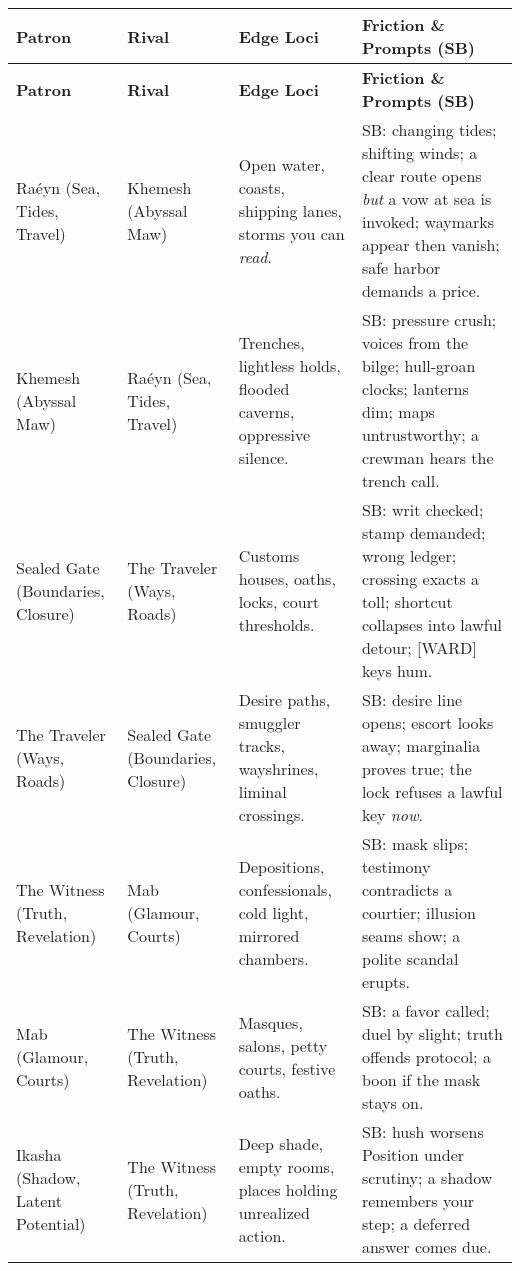 \begin{longtable}{@{}p{3.3cm}p{3.3cm}p{4.6cm}p{7.2cm}@{}}
\toprule
\textbf{Patron} & \textbf{Rival} & \textbf{Edge Loci} & \textbf{Friction \& Prompts (SB)} \\
\midrule
\endfirsthead

\toprule
\textbf{Patron} & \textbf{Rival} & \textbf{Edge Loci} & \textbf{Friction \& Prompts (SB)} \\
\midrule
\endhead

\bottomrule
\endfoot
Raéyn (Sea, Tides, Travel) & Khemesh (Abyssal Maw) &
Open water, coasts, shipping lanes, storms you can \emph{read}. &
SB: changing tides; shifting winds; a clear route opens \emph{but} a vow at sea is invoked; waymarks appear then vanish; safe harbor demands a price. \\

Khemesh (Abyssal Maw) & Raéyn (Sea, Tides, Travel) &
Trenches, lightless holds, flooded caverns, oppressive silence. &
SB: pressure crush; voices from the bilge; hull-groan clocks; lanterns dim; maps untrustworthy; a crewman hears the trench call. \\

Sealed Gate (Boundaries, Closure) & The Traveler (Ways, Roads) &
Customs houses, oaths, locks, court thresholds. &
SB: writ checked; stamp demanded; wrong ledger; crossing exacts a toll; shortcut collapses into lawful detour; [WARD] keys hum. \\

The Traveler (Ways, Roads) & Sealed Gate (Boundaries, Closure) &
Desire paths, smuggler tracks, wayshrines, liminal crossings. &
SB: desire line opens; escort looks away; marginalia proves true; the lock refuses a lawful key \emph{now}. \\

The Witness (Truth, Revelation) & Mab (Glamour, Courts) &
Depositions, confessionals, cold light, mirrored chambers. &
SB: mask slips; testimony contradicts a courtier; illusion seams show; a polite scandal erupts. \\

Mab (Glamour, Courts) & The Witness (Truth, Revelation) &
Masques, salons, petty courts, festive oaths. &
SB: a favor called; duel by slight; truth offends protocol; a boon if the mask stays on. \\

Ikasha (Shadow, Latent Potential) & The Witness (Truth, Revelation) &
Deep shade, empty rooms, places holding unrealized action. &
SB: hush worsens Position under scrutiny; a shadow remembers your step; a deferred answer comes due. \\


\end{longtable}
